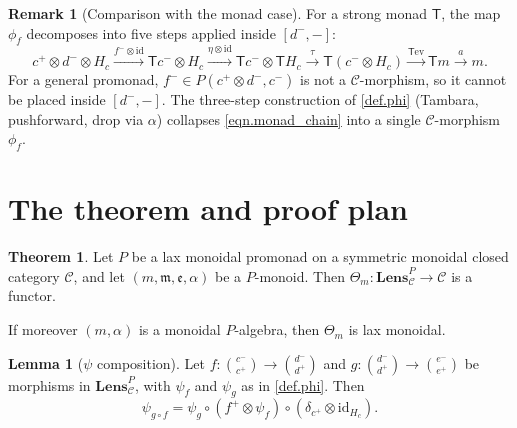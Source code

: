 \documentclass[11pt]{article}
\theoremstyle{definition}
\newtheorem{theorem}[definition]{Theorem}
\newtheorem{lemma}[definition]{Lemma}
\newtheorem{remark}[definition]{Remark}
\newcommand{\id}{\mathrm{id}}
\newcommand{\outp}[1]{#1^{+}}
\newcommand{\inpt}[1]{#1^{-}}
\newcommand{\lensob}[1]{\binom{\inpt{#1}}{\outp{#1}}}
\newcommand{\cat}[1]{\mathcal{#1}}
\newcommand{\Cat}[1]{\mathbf{#1}}
\newcommand{\Fun}[1]{\textsf{#1}}
\newcommand{\LensP}[2]{\Cat{Lens}_{#1}^{#2}}
\newcommand{\ev}{\mathrm{ev}}
\newcommand{\To}[1]{\xrightarrow{#1}}
\newcommand{\ihom}[2]{[#1,#2]}
\begin{document}
\begin{remark}[Comparison with the monad case]\label{rmk.comparison}
For a strong monad $\Fun{T}$, the map $\phi_f$ decomposes into five steps applied inside $\ihom{\inpt{d}}{-}$:
\begin{equation}\label{eqn.monad_chain}
\outp{c}\otimes\inpt{d}\otimes H_c\To{\inpt{f}\otimes\id}\Fun{T}\inpt{c}\otimes H_c\To{\eta\otimes\id}\Fun{T}\inpt{c}\otimes\Fun{T}H_c\To{\tau}\Fun{T}(\inpt{c}\otimes H_c)\To{\Fun{T}\ev}\Fun{T}m\To{a}m.
\end{equation}
For a general promonad, $\inpt{f}\in P(\outp{c}\otimes\inpt{d},\inpt{c})$ is not a $\cat{C}$-morphism, so it cannot be placed inside $\ihom{\inpt{d}}{-}$. The three-step construction of \cref{def.phi} (Tambara, pushforward, drop via $\alpha$) collapses \eqref{eqn.monad_chain} into a single $\cat{C}$-morphism $\phi_f$.
\end{remark}


\section{The theorem and proof plan}

\begin{theorem}\label{thm.promonad_theta}
Let $P$ be a lax monoidal promonad on a symmetric monoidal closed category $\cat{C}$, and let $(m,\mathfrak{m},\mathfrak{e},\alpha)$ be a $P$-monoid. Then $\Theta_m\colon\LensP{\cat{C}}{P}\to\cat{C}$ is a functor.

If moreover $(m,\alpha)$ is a monoidal $P$-algebra, then $\Theta_m$ is lax monoidal.
\end{theorem}

\begin{lemma}[$\psi$ composition]\label{lem.psi_compose}
Let $f\colon\lensob{c}\to\lensob{d}$ and $g\colon\lensob{d}\to\lensob{e}$ be morphisms in $\LensP{\cat{C}}{P}$, with $\psi_f$ and $\psi_g$ as in \cref{def.phi}. Then
\begin{equation}\label{eqn.psi_compose}
\psi_{g\circ f}=\psi_g\circ(\outp{f}\otimes\psi_f)\circ(\delta_{\outp{c}}\otimes\id_{H_c}).
\end{equation}
\end{lemma}
\end{document}

